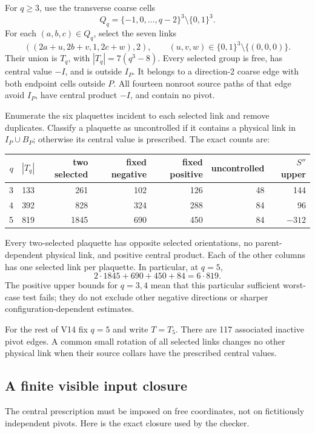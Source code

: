 \documentclass[11pt,oneside]{article}
\begin{document}
For \(q\ge3\), use the transverse coarse cells
\[
 Q_q=\{-1,0,\ldots,q-2\}^3\setminus\{0,1\}^3.
\]
For each \((a,b,c)\in Q_q\), select the seven
links
\[
 ((2a+u,2b+v,1,2c+w),2),\qquad
 (u,v,w)\in\{0,1\}^3\setminus\{(0,0,0)\}.
\]
Their union is \(T_q\), with
\(|T_q|=7(q^3-8)\). Every selected group is
free, has central value \(-I\), and is
outside \(I_P\). It belongs to a direction-2
coarse edge with both endpoint cells outside
\(P\). All fourteen nonroot source paths of
that edge avoid \(I_P\), have central product
\(-I\), and contain no pivot.

Enumerate the six plaquettes incident to each
selected link and remove duplicates. Classify
a plaquette as uncontrolled if it contains
a physical link in \(I_P\cup B_P\); otherwise
its central value is prescribed. The exact
counts are:
\begin{center}\small
\begin{tabular}{rrrrrrr}
\toprule
\(q\)&\(|T_q|\)&two selected&fixed negative&fixed positive&uncontrolled&
\(S''\) upper\\
\midrule
3&133&261&102&126&48&144\\
4&392&828&324&288&84&96\\
5&819&1845&690&450&84&\(-312\)\\
\bottomrule
\end{tabular}
\end{center}
Every two-selected plaquette has opposite
selected orientations, no parent-dependent
physical link, and positive central product.
Each of the other columns has one selected
link per plaquette. In particular, at \(q=5\),
\[
 2\cdot1845+690+450+84=6\cdot819.
\]
The positive upper bounds for \(q=3,4\)
mean that this particular sufficient
worst-case test fails; they do not exclude
other negative directions or sharper
configuration-dependent estimates.

For the rest of V14 fix \(q=5\) and write
\(T=T_5\). There are 117 associated inactive
pivot edges. A common small rotation of all
selected links changes no other physical
link when their source collars have the
prescribed central values.

\subsection{A finite visible input closure}

The central prescription must be imposed on
free coordinates, not on fictitiously
independent pivots. Here is the exact closure
used by the checker.
\end{document}

